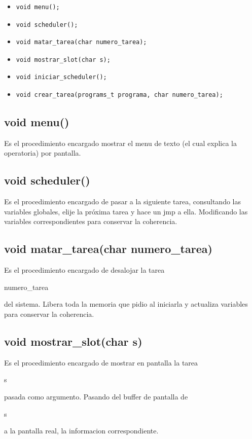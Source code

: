\documentclass[a4paper,10pt]{article}
\begin{document}
\begin{itemize}
\item \begin{verbatim}void menu(); \end{verbatim}
\item \begin{verbatim}void scheduler();\end{verbatim}
\item \begin{verbatim}void matar_tarea(char numero_tarea);\end{verbatim}
\item \begin{verbatim}void mostrar_slot(char s);\end{verbatim}
\item \begin{verbatim}void iniciar_scheduler();\end{verbatim}
\item \begin{verbatim}void crear_tarea(programs_t programa, char numero_tarea);\end{verbatim}
\end{itemize}

\subsection*{ void menu()}
Es el procedimiento encargado mostrar el menu de texto (el cual explica la operatoria) por pantalla.

\subsection*{ void scheduler()}
Es el procedimiento encargado de pasar a la siguiente tarea, consultando las variables globales, elije la próxima tarea y hace un jmp a ella. Modificando las variables correspondientes para conservar la coherencia.

\subsection*{ void matar\_tarea(char numero\_tarea) }
Es el procedimiento encargado de desalojar la tarea \begin{it}numero\_tarea\end{it} del sistema. Libera toda la memoria que pidio al iniciarla y actualiza variables para conservar la coherencia.

\subsection*{void mostrar\_slot(char s)}
Es el procedimiento encargado de mostrar en pantalla la tarea \begin{it}s\end{it} pasada como argumento. Pasando del buffer de pantalla de \begin{it}s\end{it} a la pantalla real, la informacion correspondiente.
\end{document}
